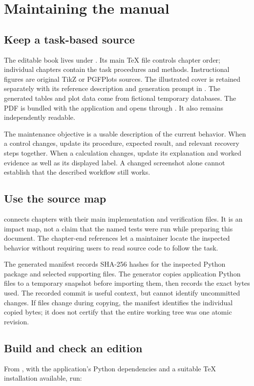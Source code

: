 \chapter{Maintaining the manual}\label{app:maintenance}
\section{Keep a task-based source}
The editable book lives under . Its main TeX file controls chapter order; individual chapters contain the task procedures and methods. Instructional figures are original TikZ or PGFPlots sources. The illustrated cover is retained separately with its reference description and generation prompt in . The generated tables and plot data come from fictional temporary databases. The PDF is bundled with the application and opens through . It also remains independently readable.

The maintenance objective is a usable description of the current behavior. When a control changes, update its procedure, expected result, and relevant recovery steps together. When a calculation changes, update its explanation and worked evidence as well as its displayed label. A changed screenshot alone cannot establish that the described workflow still works.

\section{Use the source map}
 connects chapters with their main implementation and verification files. It is an impact map, not a claim that the named tests were run while preparing this document. The chapter-end references let a maintainer locate the inspected behavior without requiring users to read source code to follow the task.

The generated manifest records SHA-256 hashes for the inspected Python package and selected supporting files. The generator copies application Python files to a temporary snapshot before importing them, then records the exact bytes used. The recorded commit is useful context, but cannot identify uncommitted changes. If files change during copying, the manifest identifies the individual copied bytes; it does not certify that the entire working tree was one atomic revision.

\section{Build and check an edition}
From , with the application's Python dependencies and a suitable TeX installation available, run:


